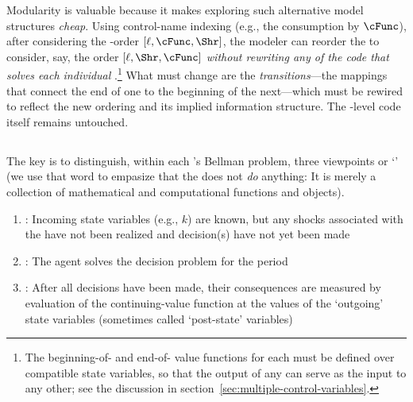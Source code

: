 \documentclass[titlepage, headings=optiontotocandhead]{econark}
\begin{document}

Modularity is valuable because it makes exploring such alternative model structures \textit{cheap}.  Using control-name indexing (e.g., the consumption {\stg} by $\cFunc$), after considering the {\stg}-order $[\ell,\cFunc,\Shr]$, the modeler can reorder the {\stgs} to consider, say, the order $[\ell,\Shr,\cFunc]$ \textit{without rewriting any of the code that solves each individual {\stg}}.\footnote{The beginning-of-{\stg} and end-of-{\stg} value functions for each {\stg} must be defined over compatible state variables, so that the output of any {\stg} can serve as the input to any other; see the discussion in section~\ref{sec:multiple-control-variables}.
}  What must change are the \textit{transitions}---the mappings that connect the end of one {\stg} to the beginning of the next---which must be rewired to reflect the new ordering and its implied information structure.  The {\stg}-level code itself remains untouched.

\hypertarget{prchs}{}
\subsection{\Prchs}\label{subsec:prchs}

The key is to distinguish, within each {\stg}'s Bellman problem, three viewpoints or `{\prchs}' (we use that word to empasize that the {\prch} does not \textit{do} anything: It is merely a collection of mathematical and computational functions and objects).
\begin{enumerate}
\item \textbf{\Arrival}: Incoming state variables (e.g., $k$) are known, but any shocks associated with the {\stg} have not been realized and decision(s) have not yet been made
\item \textbf{\Decision}: The agent solves the decision problem for the period
\item \textbf{\Continuation}: After all decisions have been made, their consequences are measured by evaluation of the continuing-value function at the values of the `outgoing' state variables (sometimes called `post-state' variables)
\end{enumerate}
\end{document}
